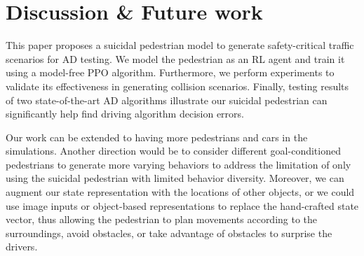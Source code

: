 \documentclass[letterpaper, 10 pt, conference]{ieeeconf}
\begin{document}
\section{Discussion \& Future work}

This paper proposes a suicidal pedestrian model to generate safety-critical traffic scenarios for AD testing. We model the pedestrian as an RL agent and train it using a model-free PPO algorithm. Furthermore, we perform %
experiments to validate its effectiveness in generating collision scenarios. Finally, testing results of two state-of-the-art AD algorithms illustrate our suicidal pedestrian can significantly help find driving algorithm decision errors.

Our work can be extended to having more pedestrians and cars in the simulations. %
Another direction would be to consider different goal-conditioned pedestrians to generate more varying behaviors to address the limitation of only using the suicidal pedestrian with limited behavior diversity.
Moreover, we can augment our state representation with the locations of other objects, or we could use image inputs or object-based representations to replace the hand-crafted state vector, thus allowing the pedestrian to plan movements according to the surroundings, avoid obstacles, or take advantage of obstacles to surprise the drivers. %











\end{document}
